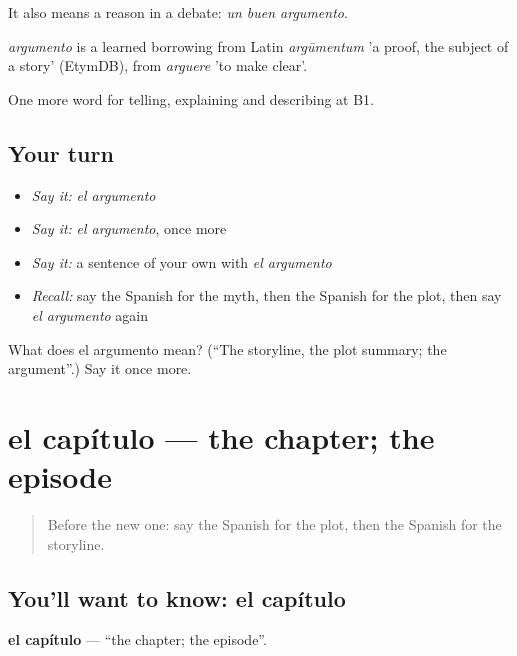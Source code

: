 It also means a reason in a debate: \emph{un buen argumento}.

\begin{cousinweb}
\emph{argumento} is a learned borrowing from Latin \emph{argūmentum} 'a proof, the subject of a story' (EtymDB), from \emph{arguere} 'to make clear'.
\end{cousinweb}

\begin{grammarlens}[title={What you've built}]
One more word for telling, explaining and describing at B1.
\end{grammarlens}

\subsection*{Your turn}
\begin{itemize}
\raggedright
  \item \emph{Say it:} \emph{el argumento}
  \item \emph{Say it:} \emph{el argumento}, once more
  \item \emph{Say it:} a sentence of your own with \emph{el argumento}
  \item \emph{Recall:} say the Spanish for the myth, then the Spanish for the plot, then say \emph{el argumento} again
\end{itemize}

\begin{tcolorbox}[breakable,colback=teal!4,colframe=teal!35!black,title={Before you move on}]
What does el argumento mean? (\textquotedblleft{}The storyline, the plot summary; the argument\textquotedblright{}.) Say it once more.
\end{tcolorbox}
\section[el capítulo]{el capítulo — the chapter; the episode}

\label{lesson:ES-C565-capitulo}



\begin{quote}
Before the new one: say the Spanish for the plot, then the Spanish for the storyline.
\end{quote}

\subsection*{You'll want to know: el capítulo}
\textbf{el capítulo} — \textquotedblleft{}the chapter; the episode\textquotedblright{}.

